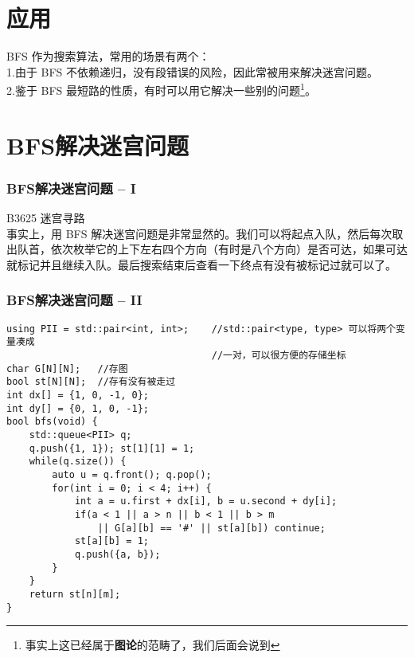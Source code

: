 \documentclass{beamer}
\newcommand{\fdf}[1]{\alert{\textbf{#1}}}
\begin{document}
\section{应用}
\begin{frame}
BFS 作为搜索算法，常用的场景有两个：\\ 
1.由于 BFS 不依赖递归，没有段错误的风险，因此常被用来解决迷宫问题。\\ 
2.鉴于 BFS 最短路的性质，有时可以用它解决一些别的问题\footnote{事实上这已经属于\fdf{图论}的范畴了，我们后面会说到}。
\end{frame}
\section{BFS解决迷宫问题}
\begin{frame}
\frametitle{BFS解决迷宫问题 -- I}
B3625 迷宫寻路\\ 
事实上，用 BFS 解决迷宫问题是非常显然的。我们可以将起点入队，然后每次取出队首，依次枚举它的上下左右四个方向（有时是八个方向）是否可达，如果可达就标记并且继续入队。最后搜索结束后查看一下终点有没有被标记过就可以了。
\end{frame}
\begin{frame}[fragile]
\frametitle{BFS解决迷宫问题 -- II}
\begin{onlyenv}
\begin{verbatim}
using PII = std::pair<int, int>;    //std::pair<type, type> 可以将两个变量凑成
                                    //一对，可以很方便的存储坐标
char G[N][N];   //存图
bool st[N][N];  //存有没有被走过
int dx[] = {1, 0, -1, 0};
int dy[] = {0, 1, 0, -1};
bool bfs(void) {
    std::queue<PII> q;
    q.push({1, 1}); st[1][1] = 1;
    while(q.size()) {
        auto u = q.front(); q.pop();
        for(int i = 0; i < 4; i++) {
            int a = u.first + dx[i], b = u.second + dy[i];
            if(a < 1 || a > n || b < 1 || b > m 
                || G[a][b] == '#' || st[a][b]) continue;
            st[a][b] = 1;
            q.push({a, b});
        }
    }
    return st[n][m];
}
\end{verbatim}
\end{onlyenv}
\end{frame}
\end{document}
